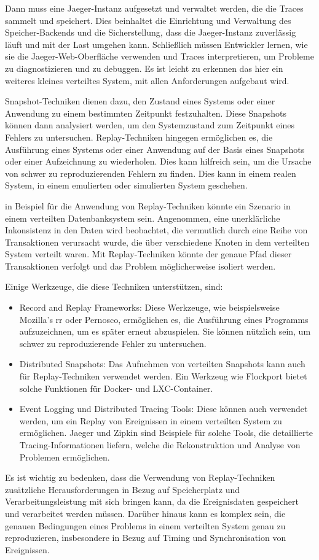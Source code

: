 Dann muss eine Jaeger-Instanz aufgesetzt und verwaltet werden, die die Traces sammelt und speichert. Dies beinhaltet die Einrichtung und Verwaltung des Speicher-Backends und die Sicherstellung, dass die Jaeger-Instanz zuverlässig läuft und mit der Last umgehen kann. Schließlich müssen Entwickler lernen, wie sie die Jaeger-Web-Oberfläche verwenden und Traces interpretieren, um Probleme zu diagnostizieren und zu debuggen.
Es ist leicht zu erkennen das hier ein weiteres kleines verteiltes System, mit allen Anforderungen aufgebaut wird. 


Snapshot-Techniken dienen dazu, den Zustand eines Systems oder einer Anwendung zu einem bestimmten Zeitpunkt festzuhalten. Diese Snapshots können dann analysiert werden, um den Systemzustand zum Zeitpunkt eines Fehlers zu untersuchen. Replay-Techniken hingegen ermöglichen es, die Ausführung eines Systems oder einer Anwendung auf der Basis eines Snapshots oder einer Aufzeichnung zu wiederholen. Dies kann hilfreich sein, um die Ursache von schwer zu reproduzierenden Fehlern zu finden. Dies kann in einem realen System, in einem emulierten oder simulierten System geschehen. 

in Beispiel für die Anwendung von Replay-Techniken könnte ein Szenario in einem verteilten Datenbanksystem sein. Angenommen, eine unerklärliche Inkonsistenz in den Daten wird beobachtet, die vermutlich durch eine Reihe von Transaktionen verursacht wurde, die über verschiedene Knoten in dem verteilten System verteilt waren. Mit Replay-Techniken könnte der genaue Pfad dieser Transaktionen verfolgt und das Problem möglicherweise isoliert werden.

Einige Werkzeuge, die diese Techniken unterstützen, sind:
\begin{itemize}
\item Record and Replay Frameworks: Diese Werkzeuge, wie beispielsweise Mozilla's rr oder Pernosco, ermöglichen es, die Ausführung eines Programms aufzuzeichnen, um es später erneut abzuspielen. Sie können nützlich sein, um schwer zu reproduzierende Fehler zu untersuchen.
\item Distributed Snapshots: Das Aufnehmen von verteilten Snapshots kann auch für Replay-Techniken verwendet werden. Ein Werkzeug wie Flockport bietet solche Funktionen für Docker- und LXC-Container.
\item Event Logging und Distributed Tracing Tools: Diese können auch verwendet werden, um ein Replay von Ereignissen in einem verteilten System zu ermöglichen. Jaeger und Zipkin sind Beispiele für solche Tools, die detaillierte Tracing-Informationen liefern, welche die Rekonstruktion und Analyse von Problemen ermöglichen.
\end{itemize}
Es ist wichtig zu bedenken, dass die Verwendung von Replay-Techniken zusätzliche Herausforderungen in Bezug auf Speicherplatz und Verarbeitungsleistung mit sich bringen kann, da die Ereignisdaten gespeichert und verarbeitet werden müssen. Darüber hinaus kann es komplex sein, die genauen Bedingungen eines Problems in einem verteilten System genau zu reproduzieren, insbesondere in Bezug auf Timing und Synchronisation von Ereignissen.


